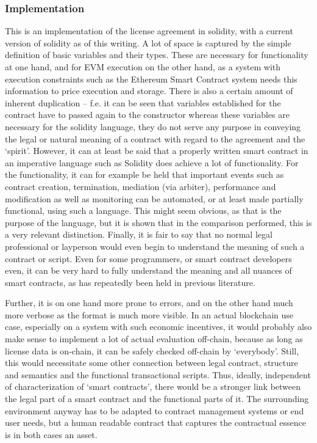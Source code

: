 \documentclass[conference]{IEEEtran}
\begin{document}
\subsubsection{Implementation}
This is an implementation of the license agreement in solidity, with a current version of solidity as of this writing. A lot of space is captured by the simple definition of basic variables and their types. These are necessary for functionality at one hand, and for EVM execution on the other hand, as a system with execution constraints such as the Ethereum Smart Contract system needs this information to price execution and storage. There is also a certain amount of inherent duplication – f.e. it can be seen that variables established for the contract have to passed again to the constructor %
whereas these variables are necessary for the solidity language, they do not serve any purpose in conveying the legal or natural meaning of a contract with regard to the agreement and the ‘spirit’.
However, it can at least be said that a properly written smart contract
in an imperative language such as Solidity does achieve a lot of functionality. For the functionality, it can for example be held that important events such as contract creation, termination, mediation (via arbiter), performance and modification as well as monitoring can be automated, or at least made partially functional, %
using such a language. This might seem obvious,
as that is the purpose of the language, but it is shown 
that in the comparison performed, this is a very relevant distinction.
Finally, it is fair to say that no normal legal professional or layperson would even begin to understand the meaning of such a contract or script. Even for some programmers, or smart contract developers even, it can be very hard to fully understand the meaning and all nuances of smart contracts, as has repeatedly been held in previous literature. \cite{allenWrappedStackedSmart2018}

Further, it is on one hand more prone to errors, and on the other hand much more verbose
as the format is much more visible. In an actual blockchain use case, especially on a 
system with such economic incentives,
it would probably also make sense to implement a lot of actual evaluation off-chain, because as long as license data is on-chain, it can be safely checked off-chain by ‘everybody’. Still, this would necessitate some other connection between legal contract, structure and semantics and the functional transactional scripts. Thus, ideally, independent of characterization of ‘smart contracts’, there would be a stronger link between the legal part of a smart contract and the functional parts of it. The surrounding environment anyway has to be adapted to contract management systems or end user needs, but a human readable contract that captures the contractual essence is in both cases an asset.
\end{document}
